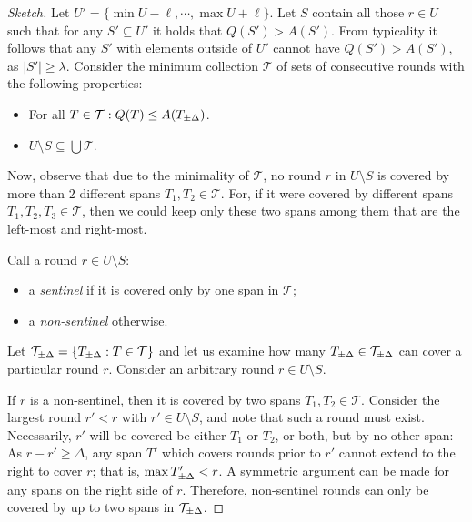 \begin{proof}[Sketch]
  Let $U' = \{\min U - \ell, \cdots, \max U + \ell\}$.
  Let $S$ contain all those $r \in U$ such that for any $S' \subseteq U'$
  it holds that $Q(S') > A(S')$. From typicality it follows that
  any $S'$ with elements outside of $U'$ cannot have $Q(S') > A(S')$,
  as $|S'| \geq \lambda$.
  Consider the minimum collection $\mathcal{T}$ of sets of consecutive rounds
  with the following properties:

  \begin{itemize}
    \item For all $T \in \mathcal{T}: Q(T) \leq A(T_{\pm\Delta})$.
    \item $U \setminus S \subseteq \bigcup \mathcal{T}$.
  \end{itemize}

  Now, observe that due to the minimality of $\mathcal{T}$, no round $r$ in
  $U \setminus S$ is covered by more than $2$ different spans
  $T_1, T_2 \in \mathcal{T}$. For, if it were covered by different spans
  $T_1, T_2, T_3 \in \mathcal{T}$, then we could keep only these two spans among
  them that are the left-most and right-most.

  Call a round $r \in U \setminus S$:
  \begin{itemize}
    \item a \emph{sentinel} if it is covered only by one span in $\mathcal{T}$;
    \item a \emph{non-sentinel} otherwise.
  \end{itemize}

  Let $\mathcal{T}_{\pm\Delta} = \{T_{\pm\Delta}: T \in \mathcal{T}\}$ and let us examine
  how many $T_{\pm\Delta} \in \mathcal{T}_{\pm\Delta}$ can cover a particular round $r$.
  Consider an arbitrary round $r \in U \setminus S$.

  If $r$ is a non-sentinel, then it is covered by two spans
  $T_1, T_2 \in \mathcal{T}$. Consider the
  largest round $r' < r$ with $r' \in U \setminus S$, and note that such a round
  must exist. Necessarily, $r'$ will be covered be either $T_1$ or $T_2$, or
  both, but by no other span: As $r - r' \geq \Delta$, any span $T'$ which
  covers rounds prior to $r'$ cannot extend to the right to cover $r$; that is,
  $\max{T'_{\pm\Delta}} < r$. A symmetric argument can be made for any spans on the
  right side of $r$. Therefore, non-sentinel rounds can only be covered by up to
  two spans in $\mathcal{T}_{\pm\Delta}$.


\end{proof}
